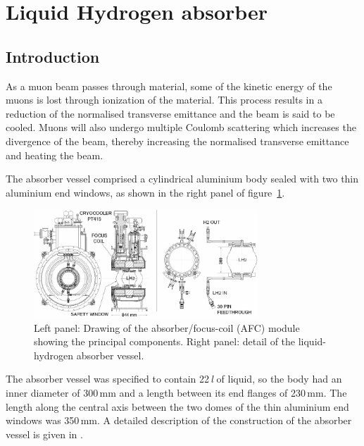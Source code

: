
\graphicspath{{11-Absorber/Figures/}}

\section{Liquid Hydrogen absorber}
\label{Sect:Absorber}

\subsection{Introduction}
As a muon beam passes through material, some of the kinetic energy
of the muons is lost through ionization of the material.
This process results in a reduction of the normalised
transverse emittance and the beam is said to be cooled.
Muons will also undergo multiple Coulomb scattering which
increases the divergence of the beam, thereby
increasing the normalised transverse emittance and heating the beam.

The absorber vessel comprised a cylindrical aluminium body sealed with
two thin aluminium end windows, as shown in the right panel of
figure~\ref{Fig:AbsorberVessel:Diag}.
\begin{figure}[htb!]
  \begin{center}
    \includegraphics[width=0.75\textwidth]{11-Absorber/Figures/AFC-drwng.pdf}
  \end{center}
  \caption{
    Left panel: Drawing of the absorber/focus-coil (AFC) module showing the principal components. Right panel: detail of the liquid-hydrogen absorber vessel.
  }
  \label{Fig:AbsorberVessel:Diag}
\end{figure}
The absorber vessel was specified to contain 22\,\textit{l} of liquid, so
the body had an inner diameter of 300\,mm and a length between its end
flanges of 230\,mm.  
The length along the central axis between the two domes of the thin aluminium end
windows was 350\,mm.
A detailed description of the construction of the absorber vessel is given in \cite{1748-0221-13-09-T09008}.

